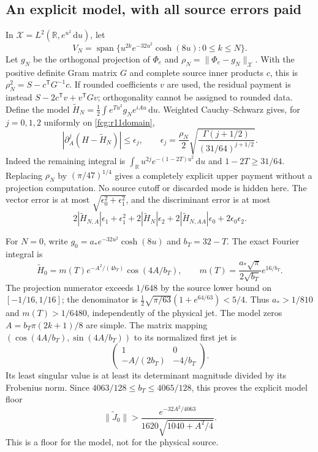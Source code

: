 \documentclass[11pt]{article}
\numberwithin{equation}{section}
\newcommand{\dd}{\,\mathrm d}
\newcommand{\R}{\mathbb R}
\begin{document}
\subsection{An explicit model, with all source errors paid}

In $\mathcal X=L^2(\R,e^{u^2}\dd u)$, let
\[
 V_N=\operatorname{span}\{u^{2k}e^{-32u^2}\cosh(8u):0\le k\le N\}.
\]
Let $g_N$ be the orthogonal projection of $\Phi_e$ and
$\rho_N=\|\Phi_e-g_N\|_{\mathcal X}$. With the positive definite
Gram matrix $G$ and complete source inner products $c$, this is
$\rho_N^2=S-c^{\mathsf T}G^{-1}c$. If rounded coefficients $v$ are
used, the residual payment is instead
$S-2c^{\mathsf T}v+v^{\mathsf T}Gv$; orthogonality cannot be
assigned to rounded data. Define the model
$\widetilde H_N=\frac12\int e^{Tu^2}g_Ne^{iAu}\dd u$.
Weighted Cauchy--Schwarz gives, for $j=0,1,2$ uniformly on
\eqref{fcg:r11domain},
\begin{equation}\label{fcg:projectionerror}
 |\partial_A^j(H-\widetilde H_N)|\le\epsilon_j,
 \qquad \epsilon_j=\frac{\rho_N}{2}
 \sqrt{\frac{\Gamma(j+1/2)}{(31/64)^{j+1/2}}}.
\end{equation}
Indeed the remaining integral is
$\int_\R u^{2j}e^{-(1-2T)u^2}\dd u$ and $1-2T\ge31/64$.
Replacing $\rho_N$ by $(\pi/47)^{1/4}$ gives a completely explicit
upper payment without a projection computation. No source cutoff or
discarded mode is hidden here. The vector error is at most
$\sqrt{\epsilon_0^2+\epsilon_1^2}$, and the discriminant error is at most
\[
 2|\widetilde H_{N,A}|\epsilon_1+\epsilon_1^2
 +2|\widetilde H_N|\epsilon_2+2|\widetilde H_{N,AA}|\epsilon_0
 +2\epsilon_0\epsilon_2.
\]

For $N=0$, write $g_0=a_*e^{-32u^2}\cosh(8u)$ and $b_T=32-T$.
The exact Fourier integral is
\begin{equation}\label{fcg:leadinggaussian}
 \widetilde H_0=m(T)e^{-A^2/(4b_T)}\cos(4A/b_T),\qquad
 m(T)=\frac{a_*\sqrt\pi}{2\sqrt{b_T}}e^{16/b_T}.
\end{equation}
The projection numerator exceeds $1/648$ by the source lower bound
on $[-1/16,1/16]$; the denominator is
$\frac12\sqrt{\pi/63}(1+e^{64/63})<5/4$.
Thus $a_*>1/810$ and $m(T)>1/6480$, independently of the physical
jet. The model zeros $A=b_T\pi(2k+1)/8$ are simple. The matrix
mapping $(\cos(4A/b_T),\sin(4A/b_T))$ to its normalized first jet is
\[
 \begin{pmatrix}1&0\\-A/(2b_T)&-4/b_T\end{pmatrix}.
\]
Its least singular value is at least its determinant magnitude
divided by its Frobenius norm. Since
$4063/128\le b_T\le4065/128$, this proves the explicit model floor
\begin{equation}\label{fcg:modelfloor}
 \|\widetilde J_0\|
 >\frac{e^{-32A^2/4063}}{1620\sqrt{1040+A^2/4}}.
\end{equation}
This is a floor for the model, not for the physical source.
\end{document}
